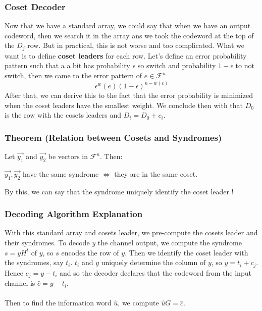 \documentclass{article}
\begin{document}
\subsubsection{Coset Decoder}
Now that we have a standard array, we could say that when we have an output codeword, then we search it in the array ans we took the codeword at the top of the $ D_j $ row. But in practical, this is not worse and too complicated. What we want is to define \textbf{coset leaders} for each row. Let's define an error probability pattern such that a a bit has probability $ \epsilon $ so switch and probability $ 1 - \epsilon $ to not switch, then we came to the error pattern of $ e \in \mathcal{F}^n $
\begin{equation}
\epsilon^w(e)(1 - \epsilon)^{n - w(e)}
\end{equation} 
After that, we can derive this to the fact that the error probability is minimized when the coset leaders have the smallest weight. We conclude then with that $ D_0 $ is the row with the cosets leaders and $ D_i = D_0 + c_i $. 

\subsubsection{Theorem (Relation between Cosets and Syndromes)}
\begin{tcolorbox}[sharp corners, colback=green!30, colframe=green!80!blue, title=Cosets and Syndromes]
Let $ \vec{y_1} $ and $ \vec{y_2} $ be vectors in $ \mathcal{F}^n $. Then:
\begin{center}
$ \vec{y_1}, \vec{y_2} $ have the same syndrome $ \Leftrightarrow $ they are in the same coset.
\end{center}
\end{tcolorbox}
\begin{tcolorbox}[width=12.1cm, leftrule=3mm]
By this, we can say that the syndrome uniquely identify the coset leader !
\end{tcolorbox}

\subsubsection{Decoding Algorithm Explanation} With this standard array and cosets leader, we pre-compute the cosets leader and their syndromes. To decode $ y $ the channel output, we compute the syndrome $ s = yH^t $ of $ y $, so $ s $ encodes the row of $ y $. Then we identify the coset leader with the syndromes, say $ t_i $. $ t_i $ and $ y $ uniquely determine the column of $ y $, so $ y = t_i + c_j $. Hence $ c_j = y - t_i $ and so the decoder declares that the codeword from the input channel is $ \hat{c} = y - t_i $.
\\
\\
Then to find the information word $ \hat{u} $, we compute $ \hat{u}G = \hat{c} $.
\end{document}
